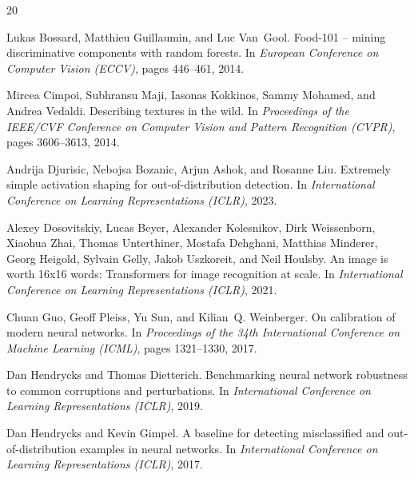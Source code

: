 \documentclass{article}
\begin{document}


\begin{thebibliography}{20}

Lukas Bossard, Matthieu Guillaumin, and Luc Van~Gool.
\newblock Food-101 -- mining discriminative components with random forests.
\newblock In \emph{European Conference on Computer Vision (ECCV)}, pages 446--461, 2014.

Mircea Cimpoi, Subhransu Maji, Iasonas Kokkinos, Sammy Mohamed, and Andrea Vedaldi.
\newblock Describing textures in the wild.
\newblock In \emph{Proceedings of the IEEE/CVF Conference on Computer Vision and Pattern Recognition (CVPR)}, pages 3606--3613, 2014.

Andrija Djurisic, Nebojsa Bozanic, Arjun Ashok, and Rosanne Liu.
\newblock Extremely simple activation shaping for out-of-distribution detection.
\newblock In \emph{International Conference on Learning Representations (ICLR)}, 2023.

Alexey Dosovitskiy, Lucas Beyer, Alexander Kolesnikov, Dirk Weissenborn, Xiaohua Zhai, Thomas Unterthiner, Mostafa Dehghani, Matthias Minderer, Georg Heigold, Sylvain Gelly, Jakob Uszkoreit, and Neil Houlsby.
\newblock An image is worth 16x16 words: Transformers for image recognition at scale.
\newblock In \emph{International Conference on Learning Representations (ICLR)}, 2021.

Chuan Guo, Geoff Pleiss, Yu Sun, and Kilian~Q. Weinberger.
\newblock On calibration of modern neural networks.
\newblock In \emph{Proceedings of the 34th International Conference on Machine Learning (ICML)}, pages 1321--1330, 2017.

Dan Hendrycks and Thomas Dietterich.
\newblock Benchmarking neural network robustness to common corruptions and perturbations.
\newblock In \emph{International Conference on Learning Representations (ICLR)}, 2019.

Dan Hendrycks and Kevin Gimpel.
\newblock A baseline for detecting misclassified and out-of-distribution examples in neural networks.
\newblock In \emph{International Conference on Learning Representations (ICLR)}, 2017.


\end{thebibliography}
\end{document}
